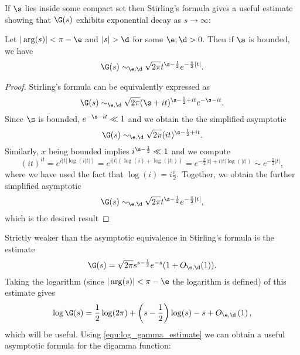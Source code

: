       If $\s$ lies inside some compact set then Stirling's formula gives a useful estimate showing that $\G(s)$ exhibits exponential decay as $s \to \infty$:
      
      \begin{corollary}\label{equ:weaker_Stirling_formula}
      Let $|\arg(s)| < \pi-\e$ and $|s| > \d$ for some $\e,\d > 0$. Then if $\s$ is bounded, we have
        \[
          \G(s) \sim_{\e,\d} \sqrt{2\pi}t^{\s-\frac{1}{2}}e^{-\frac{\pi}{2}|t|}.
        \]
      \end{corollary}
      \begin{proof}
        Stirling's formula can be equivalently expressed as
        \[
          \G(s) \sim_{\e,\d} \sqrt{2\pi}(\s+it)^{\s-\frac{1}{2}+it}e^{-\s-it}.
        \]
        Since $\s$ is bounded, $e^{-\s-it} \ll 1$ and we obtain the the simplified asymptotic
        \[
          \G(s) \sim_{\e,\d} \sqrt{2\pi}(it)^{\s-\frac{1}{2}+it}.
        \]
        Similarly, $x$ being bounded implies $i^{\s-\frac{1}{2}} \ll 1$ and we compute
        \[
          (it)^{it} = e^{i|t|\log(i|t|)} = e^{i|t|(\log(i)+\log(|t|))} = e^{-\frac{\pi}{2}|t|+i|t|\log(|t|)} \sim e^{-\frac{\pi}{2}|t|},
        \]
        where we have used the fact that $\log(i) = i\frac{\pi}{2}$. Together, we obtain the further simplified asymptotic
        \[
          \G(s) \sim_{\e,\d} \sqrt{2\pi}t^{\s-\frac{1}{2}}e^{-\frac{\pi}{2}|t|},
        \]
        which is the desired result
      \end{proof}
      Strictly weaker than the asymptotic equivalence in Stirling's formula is the estimate
      \begin{equation}
          \G(s) = \sqrt{2\pi}s^{s-\frac{1}{2}}e^{-s}(1+O_{\e,\d}(1)).
      \end{equation}
      Taking the logarithm (since $|\arg(s)| < \pi-\e$ the logarithm is defined) of this estimate gives
      \begin{equation}\label{equ:log_gamma_estimate}
        \log\G(s) = \frac{1}{2}\log(2\pi)+\left(s-\frac{1}{2}\right)\log(s)-s+O_{\e,\d}\left(1\right),
      \end{equation}
      which will be useful. Using \cref{equ:log_gamma_estimate} we can obtain a useful asymptotic formula for the digamma function:

